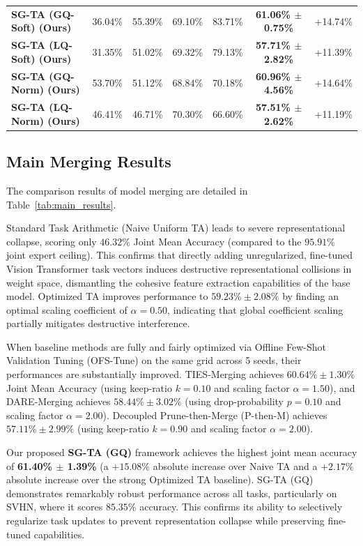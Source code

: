 \begin{table}[t]
\begin{center}
\begin{small}
\begin{sc}
\begin{tabular}{lcccccc}
\textbf{SG-TA (GQ-Soft) (Ours)} & 36.04\% & 55.39\% & 69.10\% & 83.71\% & \textbf{61.06\% $\pm$ 0.75\%} & +14.74\% \\
\textbf{SG-TA (LQ-Soft) (Ours)} & 31.35\% & 51.02\% & 69.32\% & 79.13\% & \textbf{57.71\% $\pm$ 2.82\%} & +11.39\% \\
\textbf{SG-TA (GQ-Norm) (Ours)} & 53.70\% & 51.12\% & 68.84\% & 70.18\% & \textbf{60.96\% $\pm$ 4.56\%} & +14.64\% \\
\textbf{SG-TA (LQ-Norm) (Ours)} & 46.41\% & 46.71\% & 70.30\% & 66.60\% & \textbf{57.51\% $\pm$ 2.62\%} & +11.19\% \\
\bottomrule
\end{tabular}
\end{sc}
\end{small}
\end{center}
\vskip -0.1in
\end{table}

\subsection{Main Merging Results}
\label{subsec:results}
The comparison results of model merging are detailed in Table~\ref{tab:main_results}. 

Standard Task Arithmetic (Naive Uniform TA) leads to severe representational collapse, scoring only $46.32\%$ Joint Mean Accuracy (compared to the $95.91\%$ joint expert ceiling). This confirms that directly adding unregularized, fine-tuned Vision Transformer task vectors induces destructive representational collisions in weight space, dismantling the cohesive feature extraction capabilities of the base model. Optimized TA improves performance to $59.23\% \pm 2.08\%$ by finding an optimal scaling coefficient of $\alpha = 0.50$, indicating that global coefficient scaling partially mitigates destructive interference.

When baseline methods are fully and fairly optimized via Offline Few-Shot Validation Tuning (OFS-Tune) on the same grid across 5 seeds, their performances are substantially improved. TIES-Merging achieves $60.64\% \pm 1.30\%$ Joint Mean Accuracy (using keep-ratio $k=0.10$ and scaling factor $\alpha=1.50$), and DARE-Merging achieves $58.44\% \pm 3.02\%$ (using drop-probability $p=0.10$ and scaling factor $\alpha=2.00$). Decoupled Prune-then-Merge (P-then-M) achieves $57.11\% \pm 2.99\%$ (using keep-ratio $k=0.90$ and scaling factor $\alpha=2.00$).

Our proposed \textbf{SG-TA (GQ)} framework achieves the highest joint mean accuracy of \textbf{61.40\% $\pm$ 1.39\%} (a $+15.08\%$ absolute increase over Naive TA and a $+2.17\%$ absolute increase over the strong Optimized TA baseline). SG-TA (GQ) demonstrates remarkably robust performance across all tasks, particularly on SVHN, where it scores $85.35\%$ accuracy. This confirms its ability to selectively regularize task updates to prevent representation collapse while preserving fine-tuned capabilities.

